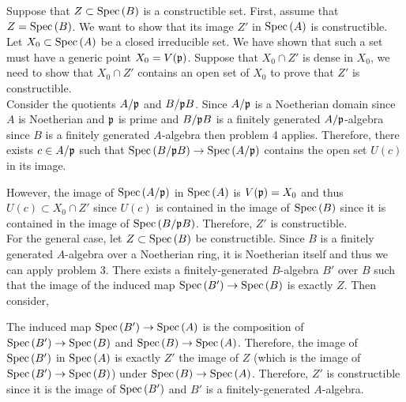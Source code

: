 \documentclass[12pt]{extarticle}
\begin{document}
Suppose that $Z \subset \mathrm{Spec}\left( B \right)$ is a constructible set. First, assume that $Z = \mathrm{Spec}\left( B \right)$. We want to show that its image $Z'$ in $\mathrm{Spec}\left( A \right)$ is constructible. Let $X_0 \subset \mathrm{Spec}\left( A \right)$ be a closed irreducible set. We have shown that such a set must have a generic point $X_0 = V(\mathfrak{p})$. Suppose that $X_0 \cap Z'$ is dense in $X_0$, we need to show that $X_0 \cap Z'$ contains an open set of $X_0$ to prove that $Z'$ is constructible.
\bigskip\\
Consider the quotients $A / \mathfrak{p}$ and $B / \mathfrak{p} B$. Since $A / \mathfrak{p}$ is a Noetherian domain since $A$ is Noetherian and $\mathfrak{p}$ is prime and $B / \mathfrak{p} B$ is a finitely generated $A / \mathfrak{p}$-algebra since $B$ is a finitely generated $A$-algebra then problem 4 applies. Therefore, there exists $c \in A / \mathfrak{p}$ such that $\mathrm{Spec}\left( B / \mathfrak{p} B \right) \to \mathrm{Spec}\left( A / \mathfrak{p} \right)$ contains the open set $U(c)$ in its image.
\begin{center}
\end{center}
However, the image of $\mathrm{Spec}\left( A / \mathfrak{p} \right)$ in $\mathrm{Spec}\left( A \right)$ is $V(\mathfrak{p}) = X_0$ and thus $U(c) \subset X_0 \cap Z'$ since $U(c)$ is contained in the image of $\mathrm{Spec}\left( B \right)$ since it is contained in the image of $\mathrm{Spec}\left( B / \mathfrak{p} B \right)$. Therefore, $Z'$ is constructible.
\bigskip\\
For the general case, let $Z \subset \mathrm{Spec}\left( B \right)$ be constructible. Since $B$ is a finitely generated $A$-algebra over a Noetherian ring, it is Noetherian itself and thus we can apply problem 3. There exists a finitely-generated $B$-algebra $B'$ over $B$ such that the image of the induced map $\mathrm{Spec}\left( B' \right) \to \mathrm{Spec}\left( B \right)$ is exactly $Z$. Then consider,
\begin{center}
\end{center}
The induced map $\mathrm{Spec}\left( B' \right) \to \mathrm{Spec}\left( A \right)$ is the composition of $\mathrm{Spec}\left( B' \right) \to \mathrm{Spec}\left( B \right)$ and $\mathrm{Spec}\left( B \right) \to \mathrm{Spec}\left( A \right)$. Therefore, the image of $\mathrm{Spec}\left( B' \right)$ in $\mathrm{Spec}\left( A \right)$ is exactly $Z'$ the image of $Z$ (which is the image of $\mathrm{Spec}\left( B' \right) \to \mathrm{Spec}\left( B \right)$) under $\mathrm{Spec}\left( B \right) \to \mathrm{Spec}\left( A \right)$. Therefore, $Z'$ is constructible since it is the image of $\mathrm{Spec}\left( B' \right)$ and $B'$ is a finitely-generated $A$-algebra. 
\end{document}
